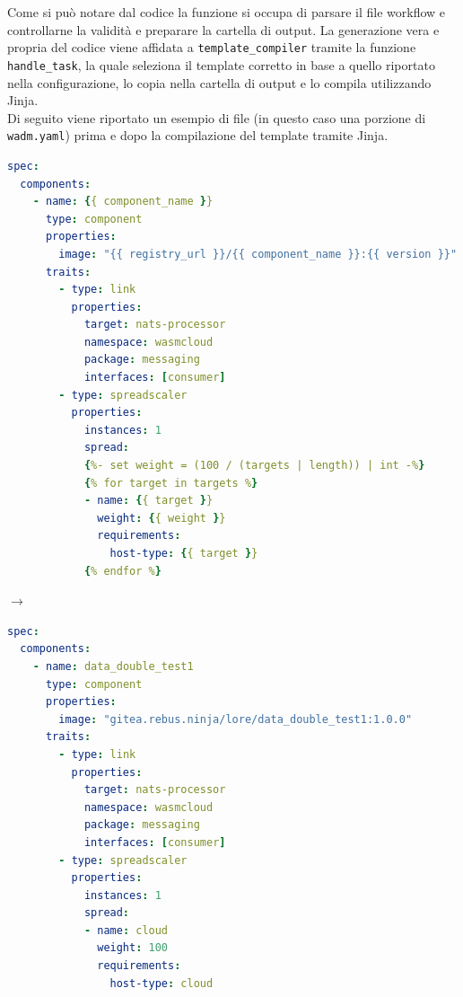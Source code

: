 Come si può notare dal codice la funzione si occupa di parsare il file workflow e controllarne la validità e preparare la cartella di output. La generazione vera e propria del codice viene affidata a \texttt{template\_compiler} tramite la funzione \texttt{handle\_task}, la quale seleziona il template corretto in base a quello riportato nella configurazione, lo copia nella cartella di output e lo compila utilizzando Jinja.\\
Di seguito viene riportato un esempio di file (in questo caso una porzione di \texttt{wadm.yaml}) prima e dopo la compilazione del template tramite Jinja.\\

\noindent\begin{minipage}{.46\textwidth}
\begin{lstlisting}[caption=Template wadm.yaml, language=yaml, basicstyle=\scriptsize, frame=single]
spec:
  components:
    - name: {{ component_name }}
      type: component
      properties:
        image: "{{ registry_url }}/{{ component_name }}:{{ version }}"
      traits:
        - type: link
          properties:
            target: nats-processor
            namespace: wasmcloud
            package: messaging
            interfaces: [consumer]
        - type: spreadscaler
          properties:
            instances: 1
            spread:
            {%- set weight = (100 / (targets | length)) | int -%}
            {% for target in targets %}
            - name: {{ target }}
              weight: {{ weight }}
              requirements:
                host-type: {{ target }}
            {% endfor %}
\end{lstlisting}
\end{minipage}
\hfill
$\rightarrow$
\hfill
\begin{minipage}{.46\textwidth}
\begin{lstlisting}[caption=wadm.yaml compilato con Jinja, language=yaml, basicstyle=\scriptsize, frame=single]
spec:
  components:
    - name: data_double_test1
      type: component
      properties:
        image: "gitea.rebus.ninja/lore/data_double_test1:1.0.0"
      traits:
        - type: link
          properties:
            target: nats-processor
            namespace: wasmcloud
            package: messaging
            interfaces: [consumer]
        - type: spreadscaler
          properties:
            instances: 1
            spread:
            - name: cloud
              weight: 100
              requirements:
                host-type: cloud
\end{lstlisting}
\end{minipage}

